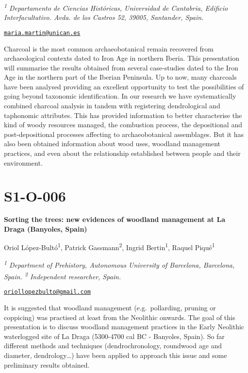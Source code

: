 \documentclass[
]{book}
\begin{document}
\emph{\textsuperscript{1} Departamento de Ciencias Históricas, Universidad de Cantabria, Edificio Interfacultativo. Avda. de los Castros 52, 39005, Santander, Spain.}

\href{mailto:maria.martin@unican.es}{\nolinkurl{maria.martin@unican.es}}

Charcoal is the most common archaeobotanical remain recovered from archaeological contexts dated to Iron Age in northern Iberia. This presentation will summarise the results obtained from several case-studies dated to the Iron Age in the northern part of the Iberian Peninsula. Up to now, many charcoals have been analysed providing an excellent opportunity to test the possibilities of going beyond taxonomic identification. In our research we have systematically combined charcoal analysis in tandem with registering dendrological and taphonomic attributes. This has provided information to better characterise the kind of woody resources managed, the combustion process, the depositional and post-depositional processes affecting to archaeobotanical assemblages. But it has also been obtained information about wood uses, woodland management practices, and even about the relationship established between people and their environment.

\hypertarget{s1-o-006}{%
\section*{S1-O-006}\label{s1-o-006}}

\textbf{Sorting the trees: new evidences of woodland management at La Draga (Banyoles, Spain)}

Oriol López-Bultó\textsuperscript{1}, Patrick Gassmann\textsuperscript{2}, Ingrid Bertin\textsuperscript{1}, Raquel Piqué\textsuperscript{1}

\emph{\textsuperscript{1} Department of Prehistory, Autonomous University of Barcelona, Barcelona, Spain. \textsuperscript{2} Independent researcher, Spain.}

\href{mailto:oriollopezbulto@gmail.com}{\nolinkurl{oriollopezbulto@gmail.com}}

It is suggested that woodland management (e.g.~pollarding, pruning or coppicing) was practised at least from the Neolithic onwards. The goal of this presentation is to discuss woodland management practices in the Early Neolithic waterlogged site of La Draga (5300-4700 cal BC - Banyoles, Spain). So far different methods and techniques (dendrochronology, roundwood age and diameter, dendrology\ldots) have been applied to approach this issue and some preliminary results obtained.
\end{document}
